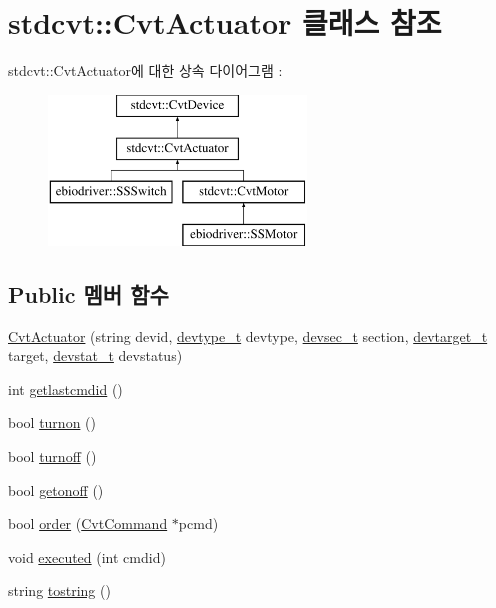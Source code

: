 \hypertarget{classstdcvt_1_1CvtActuator}{}\section{stdcvt\+:\+:Cvt\+Actuator 클래스 참조}
\label{classstdcvt_1_1CvtActuator}
stdcvt\+:\+:Cvt\+Actuator에 대한 상속 다이어그램 \+: \begin{figure}[H]
\begin{center}
\leavevmode
\includegraphics[height=4.000000cm]{classstdcvt_1_1CvtActuator}
\end{center}
\end{figure}
\subsection*{Public 멤버 함수}
\begin{DoxyCompactItemize}
\item 
\hyperlink{classstdcvt_1_1CvtActuator_a6e634ccf55c518a0c024200ba6d1bef8}{Cvt\+Actuator} (string devid, \hyperlink{cvtcode_8h_ae8e34073e35cef0bb47c7fa535fc638b}{devtype\+\_\+t} devtype, \hyperlink{cvtcode_8h_a268eebb73363e24b9e65fd51973bd9c0}{devsec\+\_\+t} section, \hyperlink{cvtcode_8h_a2b37fd5cc4d40c0b8c4b987c271e5ceb}{devtarget\+\_\+t} target, \hyperlink{cvtcode_8h_ad21cd565f839adc5b19a0993e7da7278}{devstat\+\_\+t} devstatus)
\item 
int \hyperlink{classstdcvt_1_1CvtActuator_a2e9fb1b6464f765d33b2a3b9f1abb0d1}{getlastcmdid} ()
\item 
bool \hyperlink{classstdcvt_1_1CvtActuator_aba92e55391d3a2e8c64933ec50a5db34}{turnon} ()
\item 
bool \hyperlink{classstdcvt_1_1CvtActuator_aa90cc45faf4243f23b8d8ee12b101c82}{turnoff} ()
\item 
bool \hyperlink{classstdcvt_1_1CvtActuator_aa9ebece7df16e1469e85f3e772179001}{getonoff} ()
\item 
bool \hyperlink{classstdcvt_1_1CvtActuator_a4ad6f7f3c6155ad3be892a94d28c844c}{order} (\hyperlink{classstdcvt_1_1CvtCommand}{Cvt\+Command} $\ast$pcmd)
\item 
void \hyperlink{classstdcvt_1_1CvtActuator_a0308cadcff46d88318f30cb5610ec9bf}{executed} (int cmdid)
\item 
string \hyperlink{classstdcvt_1_1CvtActuator_a088f0d1854430c12199e9f2b6bee3453}{tostring} ()
\end{DoxyCompactItemize}
